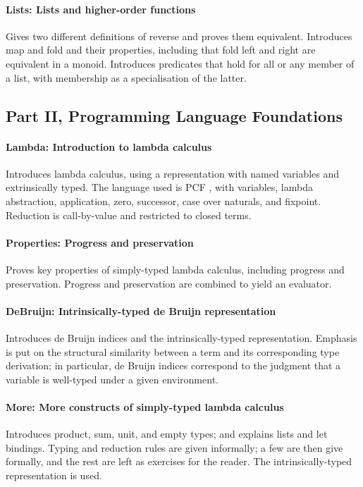 \documentclass[preprint,authoryear]{elsarticle}
\begin{document}
\paragraph{Lists: Lists and higher-order functions}
Gives two different definitions of reverse and proves them equivalent.
Introduces map and fold and their properties, including that fold left
and right are equivalent in a monoid.  Introduces predicates that hold
for all or any member of a list, with membership as a specialisation
of the latter.

\subsection*{Part II, Programming Language Foundations}

\paragraph{Lambda: Introduction to lambda calculus}
Introduces lambda calculus, using a representation with named
variables and extrinsically typed. The language used is PCF
\citep{Plotkin-1977}, with variables, lambda abstraction, application,
zero, successor, case over naturals, and fixpoint. Reduction is
call-by-value and restricted to closed terms.

\paragraph{Properties: Progress and preservation}
Proves key properties of simply-typed
lambda calculus, including progress and preservation.  Progress and
preservation are combined to yield an evaluator.

\paragraph{DeBruijn: Intrinsically-typed de Bruijn representation}
Introduces de Bruijn indices and the intrinsically-typed representation.
Emphasis is put on the structural similarity between a term and its
corresponding type derivation; in particular, de Bruijn indices
correspond to the judgment that a variable is well-typed under a given
environment.

\paragraph{More: More constructs of simply-typed lambda calculus}
Introduces product, sum, unit, and empty types; and explains lists and let bindings.
Typing and reduction rules are given informally; a few
are then give formally, and the rest are left as exercises for the reader.
The intrinsically-typed representation is used.
\end{document}
